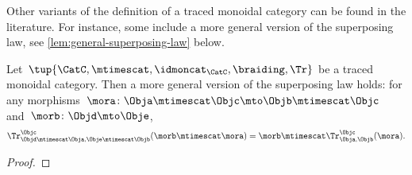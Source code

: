 \begin{remark}
    Other variants of the definition of a traced monoidal category can be found in the literature. For instance, some include a more general version of the superposing law, see \cref{lem:general-superposing-law} below.
\end{remark}

\begin{lemma}
    \label{lem:general-superposing-law}
    Let~$\tup{\CatC,\mtimescat,\idmoncat_{\CatC}, \braiding, \Tr}$ be a traced monoidal category.
    Then a more general version
    of the superposing law holds: for any morphisms~$\mora\colon \Obja\mtimescat \Objc \mto \Objb \mtimescat \Objc$ and~$\morb \colon \Objd \mto \Obje$,
    \begin{equation}
        \label{eq:superposing_2}
        \Tr_{\Objd\mtimescat \Obja,\Obje\mtimescat \Objb}^{\Objc}(\morb \mtimescat \mora)=\morb \mtimescat \Tr_{\Obja,\Objb}^\Objc(\mora).
    \end{equation}
\end{lemma}

\begin{proof}
\end{proof}

